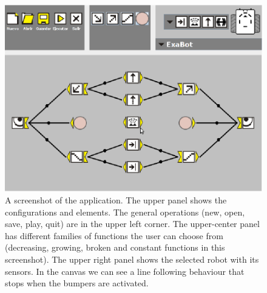 \begin{figure}
 \centering
 \includegraphics[scale=0.3]{images/gui_canvas.png}
 \caption{A screenshot of the application. The upper panel shows the configurations and elements. The general operations (new, open, save, play, quit) are in the upper left corner. The upper-center panel has different families of functions the user can choose from (decreasing, growing, broken and constant functions in this screenshot). The upper right panel shows the selected robot with its sensors. In the canvas we can see a line following behaviour that stops when the bumpers are activated.}
 \label{Fig:guiCanvas}
\end{figure}

